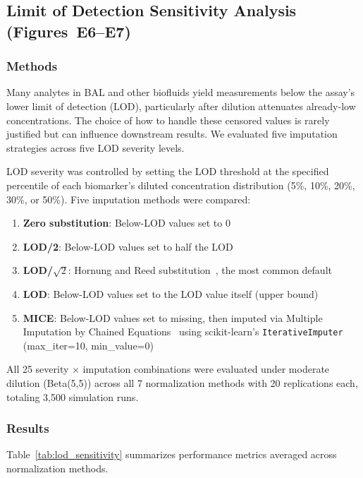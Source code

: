 \documentclass[12pt]{article}
\begin{document}
\subsection{Limit of Detection Sensitivity Analysis (Figures~E6--E7)}

\subsubsection{Methods}

Many analytes in BAL and other biofluids yield measurements below the assay's lower limit of detection (LOD), particularly after dilution attenuates already-low concentrations. The choice of how to handle these censored values is rarely justified but can influence downstream results. We evaluated five imputation strategies across five LOD severity levels.

LOD severity was controlled by setting the LOD threshold at the specified percentile of each biomarker's diluted concentration distribution (5\%, 10\%, 20\%, 30\%, or 50\%). Five imputation methods were compared:
\begin{enumerate}
\item \textbf{Zero substitution}: Below-LOD values set to 0
\item \textbf{LOD/2}: Below-LOD values set to half the LOD
\item \textbf{LOD/$\sqrt{2}$}: Hornung and Reed substitution~\cite{Hornung1990}, the most common default
\item \textbf{LOD}: Below-LOD values set to the LOD value itself (upper bound)
\item \textbf{MICE}: Below-LOD values set to missing, then imputed via Multiple Imputation by Chained Equations~\cite{vanBuuren2011} using scikit-learn's \texttt{IterativeImputer} (max\_iter=10, min\_value=0)
\end{enumerate}

All 25 severity $\times$ imputation combinations were evaluated under moderate dilution (Beta(5,5)) across all 7 normalization methods with 20 replications each, totaling 3,500 simulation runs.

\subsubsection{Results}

Table~\ref{tab:lod_sensitivity} summarizes performance metrics averaged across normalization methods.
\end{document}
